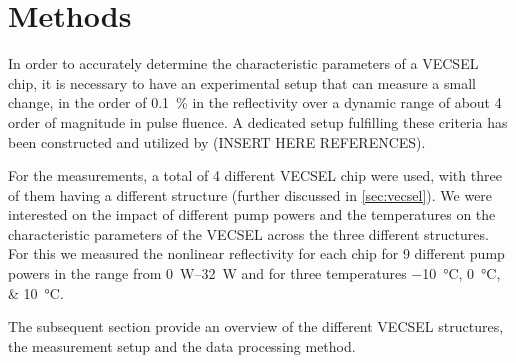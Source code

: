 \chapter{Methods}\label{chapter:methods}
In order to accurately determine the characteristic parameters of a VECSEL chip, it is necessary to have an experimental setup that can measure a small change, in the order of \qty{0.1}{\percent} in the reflectivity over a dynamic range of about 4 order of magnitude in pulse fluence. A dedicated setup fulfilling these criteria has been constructed and utilized by  (INSERT HERE REFERENCES).

For the measurements, a total of 4 different VECSEL chip were used, with three of them having a different structure (further discussed in \cref{sec:vecsel}). We were interested on the impact of different pump powers and the temperatures on the characteristic parameters of the VECSEL across the three different structures. For this we measured the nonlinear reflectivity for each chip for 9 different pump powers in the range from \qtyrange{0}{32}{\watt} and for three temperatures \qtylist{-10;0;10}{\degreeCelsius}.

The subsequent section provide an overview of the different VECSEL structures, the measurement setup and the data processing method.








